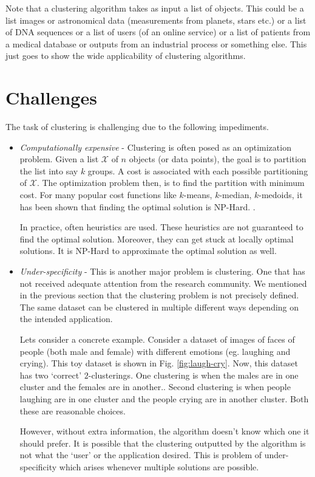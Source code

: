 \documentclass[letterpaper,12pt,titlepage,oneside,final]{book}
\newcommand{\mc}{\mathcal}
\begin{document}
Note that a clustering algorithm takes as input a list of objects. This could be a list images or astronomical data (measurements from planets, stars etc.) or a list of DNA sequences or a list of users (of an online service) or a list of patients from a medical database or outputs from an industrial process or something else. This just goes to show the wide applicability of clustering algorithms. 

\section{Challenges}
\label{introduction:challenges}
The task of clustering is challenging due to the following impediments. 
\begin{itemize}
	\item \emph{Computationally expensive} - Clustering is often posed as an optimization problem. Given a list $\mc X$ of $n$ objects (or data points), the goal is to partition the list into say $k$ groups. A cost is associated with each possible partitioning of $\mc X$. The optimization problem then, is to find the partition with minimum cost. For many popular cost functions like $k$-means, $k$-median, $k$-medoids, it has been shown that finding the optimal solution is NP-Hard. \cite{dasgupta2008hardness,megiddo1984complexity}. 
	
	In practice, often heuristics are used. These heuristics are not guaranteed to find the optimal solution. Moreover, they can get stuck at locally optimal solutions. It is NP-Hard to approximate the optimal solution as well. 
	
	\item \emph{Under-specificity} - This is another major problem is clustering. One that has not received adequate attention from the research community. We mentioned in the previous section that the clustering problem is not precisely defined. The same dataset can be clustered in multiple different ways depending on the intended application. 
	
	Lets consider a concrete example. Consider a dataset of images of faces of people (both male and female) with different emotions (eg. laughing and crying). This toy dataset is shown in Fig. \ref{fig:laugh-cry}. Now, this dataset has two `correct' $2$-clusterings. One clustering is when the males are in one cluster and the females are in another.. Second clustering is when people laughing are in one cluster and the people crying are in another cluster. Both these are reasonable choices. 
	
	However, without extra information, the algorithm doesn't know which one it should prefer. It is possible that the clustering outputted by the algorithm is not what the `user' or the application desired. This is problem of under-specificity which arises whenever multiple solutions are possible. 
\end{itemize}
\end{document}
